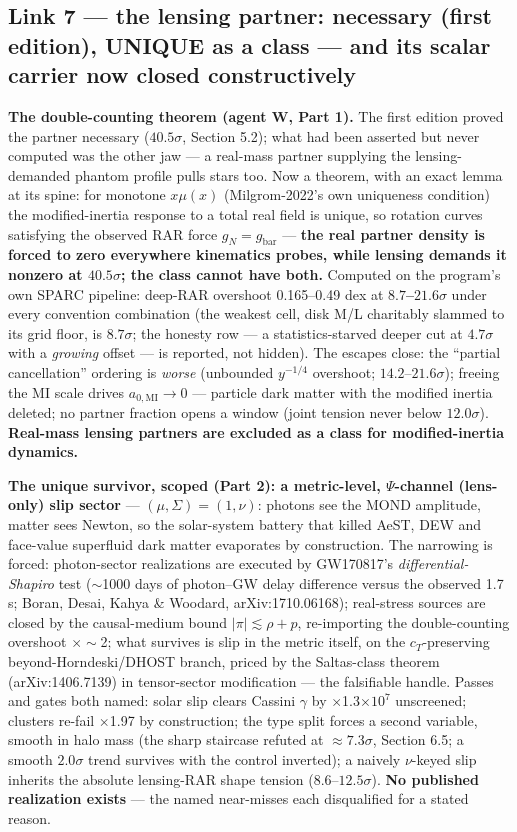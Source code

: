 \documentclass[11pt,a4paper]{article}
\begin{document}
\subsection{Link 7 --- the lensing partner: necessary (first edition), UNIQUE as a class --- and its scalar carrier now closed constructively}

\textbf{The double-counting theorem (agent W, Part 1).} The first edition proved the partner necessary ($40.5\sigma$, Section 5.2); what had been asserted but never computed was the other jaw --- a real-mass partner supplying the lensing-demanded phantom profile pulls stars too. Now a theorem, with an exact lemma at its spine: for monotone $x\mu(x)$ (Milgrom-2022's own uniqueness condition) the modified-inertia response to a total real field is unique, so rotation curves satisfying the observed RAR force $g_N = g_{\mathrm{bar}}$ --- \textbf{the real partner density is forced to zero everywhere kinematics probes, while lensing demands it nonzero at $40.5\sigma$; the class cannot have both.} Computed on the program's own SPARC pipeline: deep-RAR overshoot 0.165--0.49 dex at \textbf{$8.7$--$21.6\sigma$} under every convention combination (the weakest cell, disk M/L charitably slammed to its grid floor, is $8.7\sigma$; the honesty row --- a statistics-starved deeper cut at $4.7\sigma$ with a \emph{growing} offset --- is reported, not hidden). The escapes close: the ``partial cancellation'' ordering is \emph{worse} (unbounded $y^{-1/4}$ overshoot; $14.2$--$21.6\sigma$); freeing the MI scale drives $a_{0,\mathrm{MI}} \to 0$ --- particle dark matter with the modified inertia deleted; no partner fraction opens a window (joint tension never below $12.0\sigma$). \textbf{Real-mass lensing partners are excluded as a class for modified-inertia dynamics.}

\textbf{The unique survivor, scoped (Part 2): a metric-level, $\Psi$-channel (lens-only) slip sector} --- $(\mu, \Sigma) = (1, \nu)$: photons see the MOND amplitude, matter sees Newton, so the solar-system battery that killed AeST, DEW and face-value superfluid dark matter evaporates by construction. The narrowing is forced: photon-sector realizations are executed by GW170817's \emph{differential-Shapiro} test ($\sim$1000 days of photon--GW delay difference versus the observed 1.7 s; Boran, Desai, Kahya \& Woodard, arXiv:1710.06168); real-stress sources are closed by the causal-medium bound $|\pi| \lesssim \rho + p$, re-importing the double-counting overshoot $\times{}\sim$2; what survives is slip in the metric itself, on the $c_T$-preserving beyond-Horndeski/DHOST branch, priced by the Saltas-class theorem (arXiv:1406.7139) in tensor-sector modification --- the falsifiable handle. Passes and gates both named: solar slip clears Cassini $\gamma$ by $\times$1.3$\times10^{7}$ unscreened; clusters re-fail $\times$1.97 by construction; the type split forces a second variable, smooth in halo mass (the sharp staircase refuted at $\approx{}7.3\sigma$, Section 6.5; a smooth $2.0\sigma$ trend survives with the control inverted); a naively $\nu$-keyed slip inherits the absolute lensing-RAR shape tension ($8.6$--$12.5\sigma$). \textbf{No published realization exists} --- the named near-misses each disqualified for a stated reason.
\end{document}
